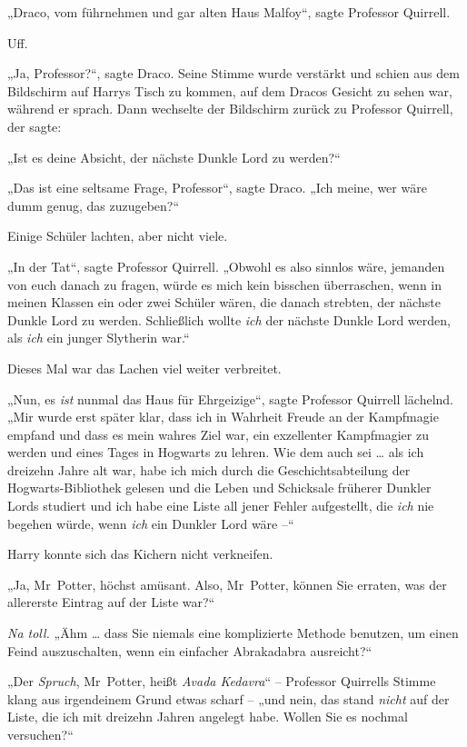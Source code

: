 {„Draco, vom führnehmen und gar alten Haus Malfoy“, sagte Professor Quirrell.

Uff.

„Ja, Professor?“, sagte Draco. Seine Stimme wurde verstärkt und schien aus dem Bildschirm auf Harrys Tisch zu kommen, auf dem Dracos Gesicht zu sehen war, während er sprach. Dann wechselte der Bildschirm zurück zu Professor Quirrell, der sagte:

„Ist es deine Absicht, der nächste Dunkle Lord zu werden?“

„Das ist eine seltsame Frage, Professor“, sagte Draco. „Ich meine, wer wäre dumm genug, das zuzugeben?“

Einige Schüler lachten, aber nicht viele.

„In der Tat“, sagte Professor Quirrell. „Obwohl es also sinnlos wäre, jemanden von euch danach zu fragen, würde es mich kein bisschen überraschen, wenn in meinen Klassen ein oder zwei Schüler wären, die danach strebten, der nächste Dunkle Lord zu werden. Schließlich wollte \emph{ich} der nächste Dunkle Lord werden, als \emph{ich} ein junger Slytherin war.“

Dieses Mal war das Lachen viel weiter verbreitet.

„Nun, es \emph{ist} nunmal das Haus für Ehrgeizige“, sagte Professor Quirrell lächelnd. „Mir wurde erst später klar, dass ich in Wahrheit Freude an der Kampfmagie empfand und dass es mein wahres Ziel war, ein exzellenter Kampfmagier zu werden und eines Tages in Hogwarts zu lehren. Wie dem auch sei … als ich dreizehn Jahre alt war, habe ich mich durch die Geschichtsabteilung der Hogwarts-Bibliothek gelesen und die Leben und Schicksale früherer Dunkler Lords studiert und ich habe eine Liste all jener Fehler aufgestellt, die \emph{ich} nie begehen würde, wenn \emph{ich} ein Dunkler Lord wäre --“

Harry konnte sich das Kichern nicht verkneifen.

„Ja, Mr~Potter, höchst amüsant. Also, Mr~Potter, können Sie erraten, was der allererste Eintrag auf der Liste war?“

\emph{Na toll.} „Ähm … dass Sie niemals eine komplizierte Methode benutzen, um einen Feind auszuschalten, wenn ein einfacher Abrakadabra ausreicht?“

„Der \emph{Spruch}, Mr~Potter, heißt \emph{Avada Kedavra}“ -- Professor Quirrells Stimme klang aus irgendeinem Grund etwas scharf -- „und nein, das stand \emph{nicht} auf der Liste, die ich mit dreizehn Jahren angelegt habe. Wollen Sie es nochmal versuchen?“

}
